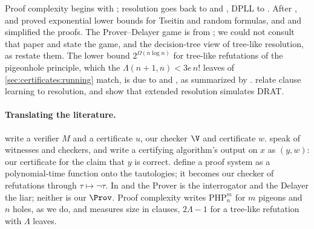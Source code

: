 \begin{refsection}
Proof complexity begins with \textcite{CookReckhow1979}; resolution goes back to \textcite{DavisPutnam1960} and \textcite{Robinson1965}, DPLL to \textcite{DavisLogemannLoveland1962}. After \textcite{Haken1985}, \textcite{Urquhart1987} and \textcite{ChvatalSzemeredi1988} proved exponential lower bounds for Tseitin and random formulas, and \textcite{BeamePitassi1996} and \textcite{BenSassonWigderson2001} simplified the proofs. The Prover--Delayer game is from \textcite{PudlakImpagliazzo2000}; we could not consult that paper and state the game, and the decision-tree view of tree-like resolution, as \textcite{BeyersdorffGalesiLauria2010} restate them. The lower bound $2^{\Omega(n\log n)}$ for tree-like refutations of the pigeonhole principle, which the $\Lambda(n+1,n)<3e\,n!$ leaves of \cref{sec:certificates:running} match, is due to \textcite{IwamaMiyazaki1999} and \textcite{DantchevRiis2001}, as summarized by \textcite{BeyersdorffGalesiLauria2010}. \Textcite{BeameKautzSabharwal2004} relate clause learning to resolution, and \textcite{KieslRebolaPardoHeule2018} show that extended resolution simulates DRAT.

\paragraph{Translating the literature.} \Textcite{AroraBarak2009} write a verifier $M$ and a certificate $u$, our checker $\V$ and certificate $w$. \Textcite{McConnellEtAl2011} speak of witnesses and checkers, and write a certifying algorithm's output on $x$ as $(y,w)$: our certificate for the claim that $y$ is correct. \Textcite{CookReckhow1979} define a proof system as a polynomial-time function onto the tautologies; it becomes our checker of refutations through $\tau\mapsto\neg\tau$. In \textcite{PudlakImpagliazzo2000} and \textcite{BeyersdorffGalesiLauria2010} the Prover is the interrogator and the Delayer the liar; neither is our $\Prov$. Proof complexity writes $\mathrm{PHP}^m_n$ for $m$ pigeons and $n$ holes, as we do, and measures size in clauses, $2\Lambda-1$ for a tree-like refutation with $\Lambda$ leaves.

\printchapterbib
\end{refsection}
